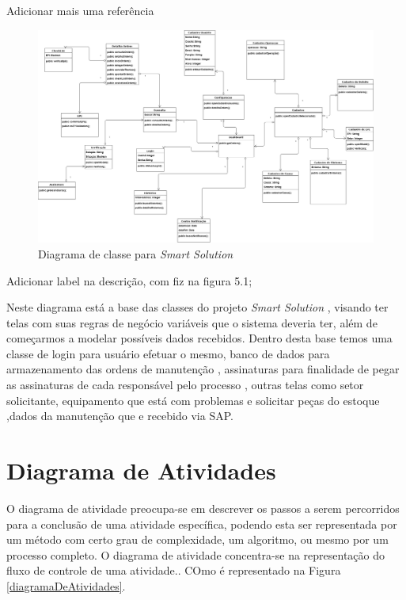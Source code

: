 {\color{red} Adicionar mais uma referência}

\newpage
\begin{figure}[H]
	\caption{\label{Diagrama_de_classe_integrado}Diagrama de classe para \textit{Smart Solution}}
	\begin{center}
		\includegraphics[scale=0.35, angle=90]{./Figuras/Diagrama_de_classe_integrado}
		
	\end{center}
\end{figure}

\newpage


{\color{red}Adicionar label na descrição, com fiz na figura 5.1;}

Neste diagrama está a base das classes do projeto\textit{ Smart Solution} , visando ter telas com suas regras de negócio variáveis que o sistema deveria ter, além de começarmos a modelar possíveis dados recebidos. Dentro desta base temos uma classe de login para usuário efetuar o mesmo, banco de dados para armazenamento das ordens de manutenção , assinaturas para finalidade de pegar as assinaturas de cada responsável pelo processo , outras telas como setor solicitante, equipamento que está com problemas e solicitar peças do estoque ,dados da manutenção que e recebido via SAP.

\newpage
\section{Diagrama de Atividades}


O diagrama de atividade preocupa-se em descrever os passos a serem percorridos para a conclusão de uma atividade específica, podendo esta ser representada por um método com certo grau de complexidade, um algoritmo, ou mesmo por um processo completo. O diagrama de atividade concentra-se na representação do fluxo de controle de uma atividade.\cite{guedes2009uml}. COmo é representado na Figura \ref{diagramaDeAtividades}.

